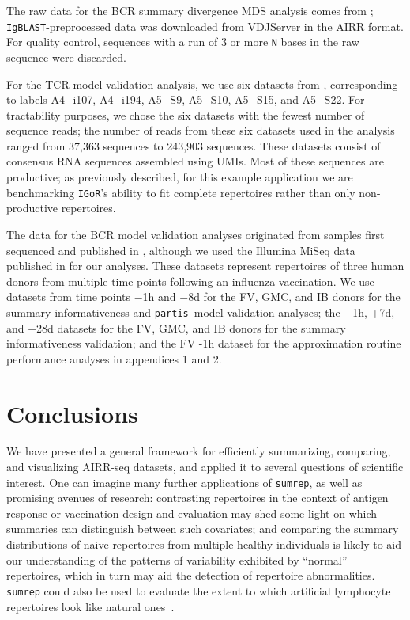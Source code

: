 \documentclass{article}
\newcommand{\partis}{\texttt{partis}}
\newcommand{\igor}{\texttt{IGoR}}
\newcommand{\igblast}{\texttt{IgBLAST}}
\begin{document}
The raw data for the BCR summary divergence MDS analysis comes from \cite{Rubelt2016-tl}; \igblast-preprocessed data was downloaded from VDJServer in the AIRR format.
For quality control, sequences with a run of 3 or more \texttt{N} bases in the raw sequence were discarded.

For the TCR model validation analysis, we use six datasets from \cite{Britanova2016-iw}, corresponding to labels A4\_i107, A4\_i194, A5\_S9, A5\_S10, A5\_S15, and A5\_S22.
For tractability purposes, we chose the six datasets with the fewest number of sequence reads; the number of reads from these six datasets used in the analysis ranged from 37,363 sequences to 243,903 sequences.
These datasets consist of consensus RNA sequences assembled using UMIs.
Most of these sequences are productive; as previously described, for this example application we are benchmarking \igor's ability to fit complete repertoires rather than only non-productive repertoires.

The data for the BCR model validation analyses originated from samples first sequenced and published in \cite{Laserson2014-dx}, although we used the Illumina MiSeq data published in \cite{Gupta2017-ve} for our analyses.
These datasets represent repertoires of three human donors from multiple time points following an influenza vaccination.
We use datasets from time points $-$1h and $-$8d for the FV, GMC, and IB donors for the summary informativeness and \partis\ model validation analyses; the +1h, +7d, and +28d datasets for the FV, GMC, and IB donors for the summary informativeness validation; and the FV -1h dataset for the approximation routine performance analyses in appendices 1 and 2.

\section*{Conclusions}
We have presented a general framework for efficiently summarizing, comparing, and visualizing AIRR-seq datasets, and applied it to several questions of scientific interest.
One can imagine many further applications of \texttt{sumrep}, as well as promising avenues of research: contrasting repertoires in the context of antigen response or vaccination design and evaluation may shed some light on which summaries can distinguish between such covariates; and comparing the summary distributions of naive repertoires from multiple healthy individuals is likely to aid our understanding of the patterns of variability exhibited by ``normal'' repertoires, which in turn may aid the detection of repertoire abnormalities.
\texttt{sumrep} could also be used to evaluate the extent to which artificial lymphocyte repertoires look like natural ones~\cite{Finlay2012}.
\end{document}
